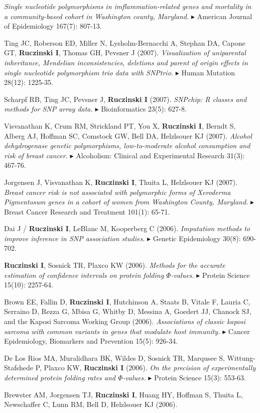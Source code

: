 \documentclass[10pt]{article}
\newcommand{\mine}{
  \addtocounter{enumi}{1}
\item[\fcolorbox{white}{grey}{\color{white} \tiny \arabic{enumi}}]
}
\newcommand{\dg}[1]{{\color{black} $\blacktriangleright$ {#1}}}
\begin{document}
{\it Single nucleotide polymorphisms in imflammation-related genes and mortality in a community-based cohort in Washington county, Maryland.} 
\dg{American Journal of Epidemiology} 167(7): 807-13. 
\item
Ting JC, Roberson ED, Miller N, Lysholm-Bernacchi A, Stephan DA, Capone GT, {\bf Ruczinski I}, Thomas GH, Pevsner J (2007). 
{\it Visualization of uniparental inheritance, Mendelian inconsistencies, deletions and parent of origin effects in single nucleotide polymorphism trio data with SNPtrio.} 
\dg{Human Mutation} 28(12): 1225-35.
\mine
Scharpf RB, Ting JC, Pevsner J, {\bf Ruczinski I} (2007). 
{\it SNPchip: R classes and methods for SNP array data.} 
\dg{Bioinformatics} 23(5): 627-8. 
\item 
Visvanathan K, Crum RM, Strickland PT, You X, {\bf Ruczinski I}, Berndt S, Alberg AJ, Hoffman SC, Comstock GW, Bell DA, Helzlsouer KJ (2007). 
{\it Alcohol dehydrogenase genetic polymorphisms, low-to-moderate alcohol consumption and risk of breast cancer.} 
\dg{Alcoholism: Clinical and Experimental Research} 31(3): 467-76. 
\item
Jorgensen J, Visvanathan K, {\bf Ruczinski I}, Thuita L, Helzlsouer KJ (2007). 
{\it Breast cancer risk is not associated with polymorphic forms of Xeroderma Pigmentosum genes in a cohort of women from Washington County, Maryland.} 
\dg{Breast Cancer Research and Treatment} 101(1): 65-71.
\mine
Dai J / {\bf Ruczinski I}, LeBlanc M, Kooperberg C (2006). 
{\it Imputation methods to improve inference in SNP association studies.} 
\dg{Genetic Epidemiology} 30(8): 690-702. 
\mine
{\bf Ruczinski I}, Sosnick TR, Plaxco KW (2006). 
{\it Methods for the accurate estimation of confidence intervals on protein folding $\Phi$-values.} 
\dg{Protein Science} 15(10): 2257-64. 
\item
Brown EE, Fallin D, {\bf Ruczinski I}, Hutchinson A, Staats B, Vitale F, Lauria C, Serraino D, Rezza G, Mbisa G, Whitby D, Messina A, Goedert JJ, Chanock SJ, and the Kaposi Sarcoma Working Group (2006). 
{\it Associations of classic kaposi sarcoma with common variants in genes that modulate host immunity.} 
\dg{Cancer Epidemiology, Biomarkers and Prevention} 15(5): 926-34.
\mine
De Los Rios MA, Muralidhara BK, Wildes D, Sosnick TR, Marqusee S, Wittung-Stafshede P, Plaxco KW, {\bf Ruczinski I} (2006). 
{\it On the precision of experimentally determined protein folding rates and $\Phi$-values.}  
\dg{Protein Science} 15(3): 553-63. 
\item
Brewster AM, Jorgensen TJ, {\bf Ruczinski I}, Huang HY, Hoffman S, Thuita L, Newschaffer C, Lunn RM, Bell D, Helzlsouer KJ (2006).
\end{document}
